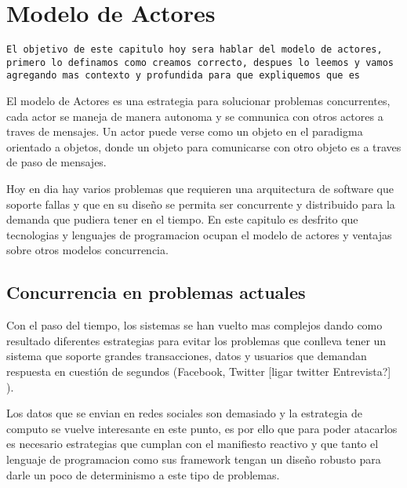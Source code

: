 
\chapter{Modelo de Actores}

\label{Chapter2}



\texttt{El objetivo de este
  capitulo hoy sera hablar del modelo de actores, primero lo definamos
  como creamos correcto, despues lo leemos y vamos agregando mas
  contexto y profundida para que expliquemos que es }

El modelo de Actores es una estrategia para solucionar problemas
concurrentes, cada actor se maneja de manera autonoma y se comnunica
con otros actores a traves de mensajes. Un actor puede verse como un
objeto en el paradigma orientado a objetos, donde un objeto para
comunicarse con otro objeto es a traves de paso de mensajes.

Hoy en dia hay varios problemas que requieren una arquitectura de
software que soporte fallas y que en su dise\~no se permita ser
concurrente y distribuido para la demanda que pudiera tener en el
tiempo. En este capitulo es desfrito que tecnologias y lenguajes de
programacion ocupan el modelo de actores y ventajas sobre otros
modelos concurrencia.


\section{Concurrencia en problemas actuales}
Con el paso del tiempo, los sistemas se han vuelto mas complejos dando
como resultado diferentes estrategias para evitar los problemas que
conlleva tener un sistema que soporte grandes transacciones, datos y
usuarios que demandan respuesta en cuestión de segundos (Facebook,
Twitter [ligar twitter Entrevista?] ).

Los datos que se envian en redes sociales son demasiado y la
estrategia de computo se vuelve interesante en este punto, es por ello
que para poder atacarlos es necesario estrategias que cumplan con el
manifiesto reactivo y que tanto el lenguaje de programacion como sus
framework tengan un diseño robusto para darle un poco de
determinismo a este tipo de problemas.

